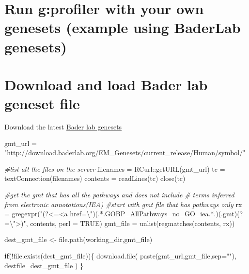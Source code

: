 \documentclass[
]{book}
\newenvironment{Shaded}{\begin{snugshade}}{\end{snugshade}}
\newcommand{\AttributeTok}[1]{\textcolor[rgb]{0.77,0.63,0.00}{#1}}
\newcommand{\CommentTok}[1]{\textcolor[rgb]{0.56,0.35,0.01}{\textit{#1}}}
\newcommand{\ConstantTok}[1]{\textcolor[rgb]{0.00,0.00,0.00}{#1}}
\newcommand{\ControlFlowTok}[1]{\textcolor[rgb]{0.13,0.29,0.53}{\textbf{#1}}}
\newcommand{\FunctionTok}[1]{\textcolor[rgb]{0.00,0.00,0.00}{#1}}
\newcommand{\NormalTok}[1]{#1}
\newcommand{\OtherTok}[1]{\textcolor[rgb]{0.56,0.35,0.01}{#1}}
\newcommand{\SpecialCharTok}[1]{\textcolor[rgb]{0.00,0.00,0.00}{#1}}
\newcommand{\StringTok}[1]{\textcolor[rgb]{0.31,0.60,0.02}{#1}}
\begin{document}
\hypertarget{run-gprofiler-with-your-own-genesets-example-using-baderlab-genesets}{%
\section{Run g:profiler with your own genesets (example using BaderLab genesets)}\label{run-gprofiler-with-your-own-genesets-example-using-baderlab-genesets}}

\hypertarget{download-and-load-bader-lab-geneset-file}{%
\section{Download and load Bader lab geneset file}\label{download-and-load-bader-lab-geneset-file}}

Download the latest \href{https://download.baderlab.org/EM_Genesets/current_release/Human/}{Bader lab genesets}

\begin{Shaded}
\begin{Highlighting}[]
\NormalTok{gmt\_url }\OtherTok{=} \StringTok{"http://download.baderlab.org/EM\_Genesets/current\_release/Human/symbol/"}

\CommentTok{\#list all the files on the server}
\NormalTok{filenames }\OtherTok{=}\NormalTok{ RCurl}\SpecialCharTok{::}\FunctionTok{getURL}\NormalTok{(gmt\_url)}
\NormalTok{tc }\OtherTok{=} \FunctionTok{textConnection}\NormalTok{(filenames)}
\NormalTok{contents }\OtherTok{=} \FunctionTok{readLines}\NormalTok{(tc)}
\FunctionTok{close}\NormalTok{(tc)}

\CommentTok{\#get the gmt that has all the pathways and does not include }
\CommentTok{\# terms inferred from electronic annotations(IEA)}
\CommentTok{\#start with gmt file that has pathways only}
\NormalTok{rx }\OtherTok{=} \FunctionTok{gregexpr}\NormalTok{(}\StringTok{"(?\textless{}=\textless{}a href=}\SpecialCharTok{\textbackslash{}"}\StringTok{)(.*.GOBP\_AllPathways\_no\_GO\_iea.*.)(.gmt)(?=}\SpecialCharTok{\textbackslash{}"}\StringTok{\textgreater{})"}\NormalTok{,}
\NormalTok{  contents, }\AttributeTok{perl =} \ConstantTok{TRUE}\NormalTok{)}
\NormalTok{gmt\_file }\OtherTok{=} \FunctionTok{unlist}\NormalTok{(}\FunctionTok{regmatches}\NormalTok{(contents, rx))}

\NormalTok{dest\_gmt\_file }\OtherTok{\textless{}{-}} \FunctionTok{file.path}\NormalTok{(working\_dir,gmt\_file)}

\ControlFlowTok{if}\NormalTok{(}\SpecialCharTok{!}\FunctionTok{file.exists}\NormalTok{(dest\_gmt\_file))\{}
  \FunctionTok{download.file}\NormalTok{(}
    \FunctionTok{paste}\NormalTok{(gmt\_url,gmt\_file,}\AttributeTok{sep=}\StringTok{""}\NormalTok{),}
    \AttributeTok{destfile=}\NormalTok{dest\_gmt\_file}
\NormalTok{  )}
\NormalTok{\}}
\end{Highlighting}
\end{Shaded}
\end{document}
